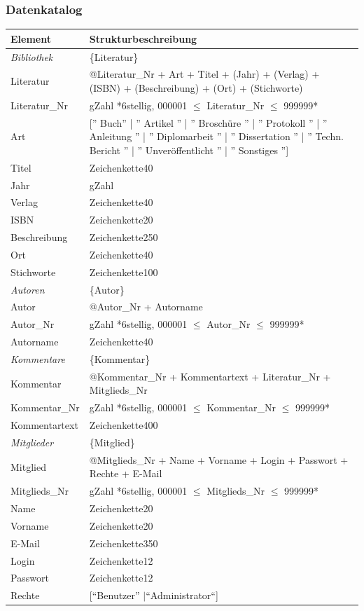 \subsubsection{Datenkatalog}
\begin{longtable}{|l|p{8.5cm}|}
\hline
Element & Strukturbeschreibung \\
\hline\hline
\endhead

\emph{Bibliothek} & \{Literatur\} \\
\hline
Literatur & @Literatur\_Nr + Art + Titel + (Jahr) + (Verlag) + (ISBN) + (Beschreibung) + (Ort) + (Stichworte) \\
\hline
Literatur\_Nr & gZahl *6stellig, 000001 $\leq$ Literatur\_Nr $\leq$ 999999* \\
\hline
Art & ['' Buch'' | '' Artikel '' | '' Broschüre '' | '' Protokoll '' | '' Anleitung '' | '' Diplomarbeit '' | '' Dissertation '' | '' Techn. Bericht '' | '' Unveröffentlicht '' | '' Sonstiges ''] \\
\hline
Titel & Zeichenkette40 \\
\hline
Jahr & gZahl \\
\hline
Verlag & Zeichenkette40 \\
\hline
ISBN & Zeichenkette20 \\
\hline
Beschreibung & Zeichenkette250 \\
\hline
Ort & Zeichenkette40 \\
\hline
Stichworte & Zeichenkette100 \\
\hline\hline

\emph{Autoren} & \{Autor\} \\
\hline
Autor & @Autor\_Nr + Autorname \\
\hline
Autor\_Nr & gZahl *6stellig, 000001 $\leq$ Autor\_Nr $\leq$ 999999* \\
\hline
Autorname & Zeichenkette40 \\
\hline\hline

\emph{Kommentare} & \{Kommentar\} \\
\hline
Kommentar & @Kommentar\_Nr + Kommentartext + Literatur\_Nr + Mitglieds\_Nr\\
\hline
Kommentar\_Nr & gZahl *6stellig, 000001 $\leq$ Kommentar\_Nr $\leq$ 999999* \\
\hline
Kommentartext & Zeichenkette400 \\
\hline\hline

\emph{Mitglieder} & \{Mitglied\} \\
\hline
Mitglied  & @Mitglieds\_Nr  + Name + Vorname + Login + Passwort + Rechte + E-Mail\\
\hline
Mitglieds\_Nr & gZahl *6stellig, 000001 $\leq$ Mitglieds\_Nr $\leq$ 999999* \\ 
\hline
Name & Zeichenkette20 \\
\hline
Vorname & Zeichenkette20 \\
\hline
E-Mail & Zeichenkette350 \\
\hline
Login & Zeichenkette12 \\
\hline
Passwort & Zeichenkette12 \\
\hline
Rechte & [``Benutzer'' $\mid $``Administrator``] \\
\hline\hline


\end{longtable}

